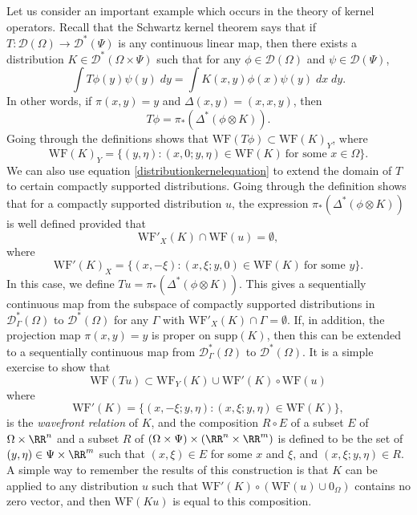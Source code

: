 Let us consider an important example which occurs in the theory of kernel operators. Recall that the Schwartz kernel theorem says that if $T: \mathcal{D}(\Omega) \to \mathcal{D}^*(\Psi)$ is any continuous linear map, then there exists a distribution $K \in \mathcal{D}^*(\Omega \times \Psi)$ such that for any $\phi \in \mathcal{D}(\Omega)$ and $\psi \in \mathcal{D}(\Psi)$,
%
\[ \int T\phi(y) \psi(y)\; dy = \int K(x,y) \phi(x) \psi(y)\; dx\; dy. \]
%
In other words, if $\pi(x,y) = y$ and $\Delta(x,y) = (x,x,y)$, then
%
\begin{equation} \label{distributionkernelequation}
    T\phi = \pi_*(\Delta^* (\phi \otimes K)).
\end{equation}
%
Going through the definitions shows that $\text{WF}(T\phi) \subset \text{WF}(K)_Y$, where
%
\[ \text{WF}(K)_Y = \{ (y,\eta) : (x,0;y,\eta) \in \text{WF}(K)\ \text{for some $x \in \Omega$} \}. \]
%
We can also use equation \eqref{distributionkernelequation} to extend the domain of $T$ to certain compactly supported distributions. Going through the definition shows that for a compactly supported distribution $u$, the expression $\pi_*(\Delta^*(\phi \otimes K))$ is well defined provided that
%
\[ \text{WF}'_X(K) \cap \text{WF}(u) = \emptyset, \]
%
where
%
\[ \text{WF}'(K)_X = \{ (x,-\xi) : (x,\xi;y,0) \in \text{WF}(K)\ \text{for some $y$} \}. \]
%
In this case, we define $Tu = \pi_*(\Delta^*(\phi \otimes K))$. This gives a sequentially continuous map from the subspace of compactly supported distributions in $\mathcal{D}^*_\Gamma(\Omega)$ to $\mathcal{D}^*(\Omega)$ for any $\Gamma$ with $\text{WF}'_X(K) \cap \Gamma = \emptyset$. If, in addition, the projection map $\pi(x,y) = y$ is proper on $\text{supp}(K)$, then this can be extended to a sequentially continuous map from $\mathcal{D}^*_\Gamma(\Omega)$ to $\mathcal{D}^*(\Omega)$. It is a simple exercise to show that
%
\[ \text{WF}(Tu) \subset \text{WF}_Y(K) \cup \text{WF}'(K) \circ \text{WF}(u) \]
%
where
%
\[ \text{WF}'(K) = \{ (x,-\xi;y,\eta) : (x,\xi;y,\eta) \in \text{WF}(K) \}, \]
%
is the \emph{wavefront relation} of $K$, and the composition $R \circ E$ of a subset $E$ of $\Omega \times \RR^n$ and a subset $R$ of $(\Omega \times \Psi) \times (\RR^n \times \RR^m)$ is defined to be the set of $(y,\eta) \in \Psi \times \RR^m$ such that $(x,\xi) \in E$ for some $x$ and $\xi$, and $(x,\xi;y,\eta) \in R$. A simple way to remember the results of this construction is that $K$ can be applied to any distribution $u$ such that $\text{WF}'(K) \circ (\text{WF}(u) \cup 0_\Omega)$ contains no zero vector, and then $\text{WF}(Ku)$ is equal to this composition.

